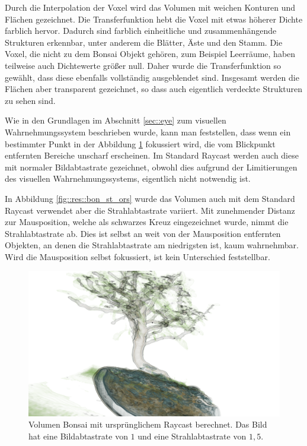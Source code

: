 Durch die Interpolation der Voxel wird das Volumen mit weichen Konturen und Flächen gezeichnet.
Die Transferfunktion hebt die Voxel mit etwas höherer Dichte farblich hervor.
Dadurch sind farblich einheitliche und zusammenhängende Strukturen erkennbar, unter anderem die Blätter, Äste und den Stamm.
Die Voxel, die nicht zu dem Bonsai Objekt gehören, zum Beispiel Leerräume, haben teilweise auch Dichtewerte größer null.
Daher wurde die Transferfunktion so gewählt, dass diese ebenfalls vollständig ausgeblendet sind.
Insgesamt werden die Flächen aber transparent gezeichnet, so dass auch eigentlich verdeckte Strukturen zu sehen sind.

Wie in den Grundlagen im Abschnitt \ref{sec::eye} zum visuellen Wahrnehmungssystem beschrieben wurde, kann man feststellen, dass wenn ein bestimmter Punkt in der Abbildung \ref{fig::res::bon_st} fokussiert wird, die vom Blickpunkt entfernten Bereiche unscharf erscheinen.
Im Standard Raycast werden auch diese mit normaler Bildabtastrate gezeichnet, obwohl dies aufgrund der Limitierungen des visuellen Wahrnehmungssystems, eigentlich nicht notwendig ist.

In Abbildung \ref{fig::res::bon_st_ors} wurde das Volumen auch mit dem Standard Raycast verwendet aber die Strahlabtastrate variiert.
Mit zunehmender Distanz zur Mausposition, welche als schwarzes Kreuz eingezeichnet wurde, nimmt die Strahlabtastrate ab.
Dies ist selbst an weit von der Mausposition entfernten Objekten, an denen die Strahlabtastrate am niedrigsten ist, kaum wahrnehmbar.
Wird die Mausposition selbst fokussiert, ist kein Unterschied feststellbar.

\begin{landscape}
	\begin{figure}
		\centering
		\includegraphics[width=\textheight]{../../Neue_Messungen/Bonsai/st.png}
		\caption{Volumen Bonsai mit ursprünglichem Raycast berechnet. Das Bild hat eine Bildabtastrate von $1$ und eine Strahlabtastrate von $1,5$.}
		\label{fig::res::bon_st}
	\end{figure}
\end{landscape}

